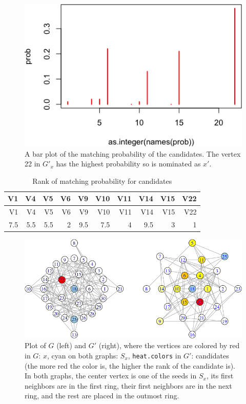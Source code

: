 \documentclass[
]{article}
\begin{document}
\begin{figure}
\centering
\includegraphics{vn_files/figure-latex/prob-1.png}
\caption{A bar plot of the matching probability of the candidates. The
vertex 22 in \(G'_x\) has the highest probability so is nominated as
\(x'\).}
\end{figure}

\begin{longtable}[]{@{}rrrrrrrrrr@{}}
\caption{Rank of matching probability for candidates}\tabularnewline
\toprule
V1 & V4 & V5 & V6 & V9 & V10 & V11 & V14 & V15 & V22\tabularnewline
\midrule
\endfirsthead
\toprule
V1 & V4 & V5 & V6 & V9 & V10 & V11 & V14 & V15 & V22\tabularnewline
\midrule
\endhead
7.5 & 5.5 & 5.5 & 2 & 9.5 & 7.5 & 4 & 9.5 & 3 & 1\tabularnewline
\bottomrule
\end{longtable}

\begin{figure}
\centering
\includegraphics{vn_files/figure-latex/plotg3-1.png}
\caption{Plot of \(G\) (left) and \(G'\) (right), where the vertices are
colored by red in \(G\): \(x\), cyan on both graphs: \(S_x\),
\texttt{heat.colors} in \(G'\): candidates (the more red the color is,
the higher the rank of the candidate is). In both graphs, the center
vertex is one of the seeds in \(S_x\), its first neighbors are in the
first ring, their first neighbors are in the next ring, and the rest are
placed in the outmost ring.}
\end{figure}
\end{document}
